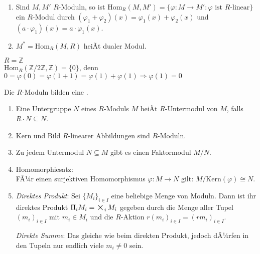 \begin{BemDef}
  \begin{enumerate}
    \item Sind $M,M'$ $R$-Moduln, so ist Hom$_R(M,M') = \{\varphi: M \to M' :
          \varphi \mbox{ ist } R\mbox{-linear}\}$ ein $R$-Modul durch
          $(\varphi_1 + \varphi_2)(x) = \varphi_1(x) + \varphi_2(x)$ und
          $(a \cdot \varphi_1)(x) = a \cdot \varphi_1(x)$.
    \item $M^* = \mbox{Hom}_R(M,R)$ heiÃt dualer Modul.
  \end{enumerate}
\end{BemDef}

\newcommand{\BIGOP}[1]{\mathop{\mathchoice%
{\raise-0.22em\hbox{\huge $#1$}}%
{\raise-0.05em\hbox{\Large $#1$}}{\hbox{\large $#1$}}{#1}}}
\newcommand{\bigtimes}{\BIGOP{\times}} 

\begin{nnBsp}
  $R = \mathbb{Z}$\\
  Hom$_R(\mathbb{Z}/2\mathbb{Z}, \mathbb{Z}) = \{ 0 \}$, denn $0 = \varphi(0) =
  \varphi(1 + 1) = \varphi(1)+\varphi(1) \Rightarrow \varphi(1) = 0$
\end{nnBsp}

\begin{Bem}
  Die $R$-Moduln bilden eine  .
  \begin{enumerate}
    \item Eine Untergruppe $N$ eines $R$-Moduls $M$ heiÃt $R$-Untermodul von
          $M$, falls $R \cdot N \subseteq N$.
    \item Kern und Bild $R$-linearer Abbildungen sind $R$-Moduln.
    \item Zu jedem Untermodul $N \subseteq M$ gibt es einen Faktormodul $M/N$.
    \item Homomorphiesatz:\\FÃ¼r einen surjektiven Homomorphismus $\varphi: M
          \rightarrow N$ gilt: $M/\mbox{Kern}(\varphi) \cong N$.
    \item \emph{Direktes Produkt}: Sei ${\{M_{i}\}}_{i \in I}$ eine beliebige
          Menge von Moduln. Dann ist ihr direktes Produkt
     	  $\Pi_i M_i = \bigtimes_i M_i$ gegeben durch die Menge aller Tupel ${(m_i)}_{i
     	  \in I}$ mit $m_i \in M_i$ und die $R$-Aktion ${r(m_i)}_{i \in I} = {(rm_i)}_{i \in I}$.

	  \emph{Direkte Summe}: Das gleiche wie beim direkten Produkt, jedoch dÃ¼rfen in den 
	  Tupeln nur endlich viele $m_i \neq 0$ sein.
  \end{enumerate}
\end{Bem}

